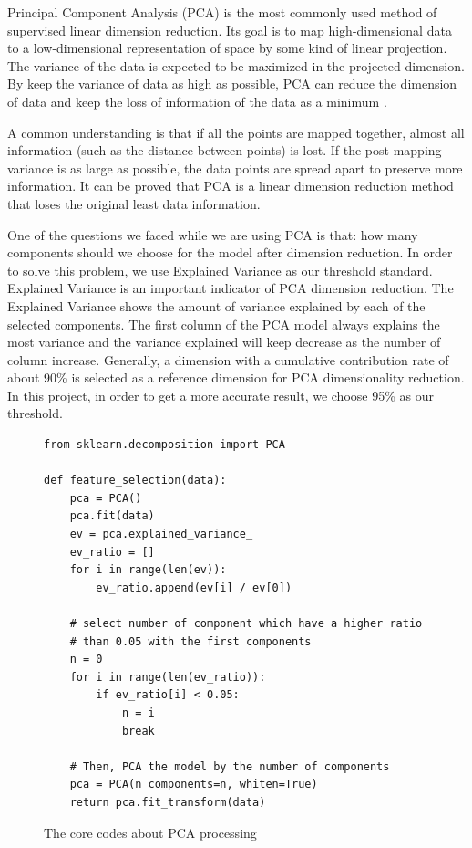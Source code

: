 \documentclass[sigconf]{acmart}
\begin{document}
Principal Component Analysis (PCA) is the most commonly used method of supervised linear dimension reduction. Its goal is to map high-dimensional data to a low-dimensional representation of space by some kind of linear projection. The variance of the data is expected to be maximized in the projected dimension. By keep the variance of data as high as possible, PCA can reduce the dimension of data and keep the loss of information of the data as a minimum \cite{PCA}.

A common understanding is that if all the points are mapped together, almost all information (such as the distance between points) is lost. If the post-mapping variance is as large as possible, the data points are spread apart to preserve more information. It can be proved that PCA is a linear dimension reduction method that loses the original least data information.

One of the questions we faced while we are using PCA is that: how many components should we choose for the model after dimension reduction. In order to solve this problem, we use Explained Variance as our threshold standard. Explained Variance is an important indicator of PCA dimension reduction. The Explained Variance shows the amount of variance explained by each of the selected components. The first column of the PCA model always explains the most variance and the variance explained will keep decrease as the number of column increase. Generally, a dimension with a cumulative contribution rate of about 90\% is selected as a reference dimension for PCA dimensionality reduction. In this project, in order to get a more accurate result, we choose 95\% as our threshold.

\begin{figure}[htb]
\centering
\begin{lstlisting}
from sklearn.decomposition import PCA

def feature_selection(data):
    pca = PCA()
    pca.fit(data)
    ev = pca.explained_variance_
    ev_ratio = []
    for i in range(len(ev)):
        ev_ratio.append(ev[i] / ev[0])

    # select number of component which have a higher ratio
    # than 0.05 with the first components
    n = 0
    for i in range(len(ev_ratio)):
        if ev_ratio[i] < 0.05:
            n = i
            break

    # Then, PCA the model by the number of components
    pca = PCA(n_components=n, whiten=True)
    return pca.fit_transform(data)
\end{lstlisting}
\caption{The core codes about PCA processing}\label{fig:pca process}
\end{figure}
\end{document}

